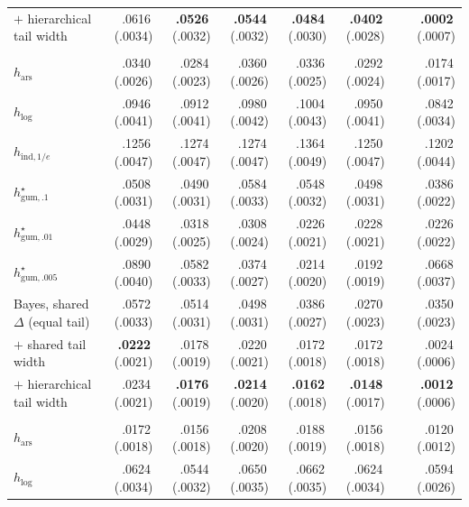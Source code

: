 \documentclass[11pt]{article}
\newcommand{\mcse}[2]{\mbox{#1\,{\fontsize{7}{8}\selectfont(#2)}}}
\newcommand{\bestmcse}[2]{\mbox{\textbf{#1}\,{\fontsize{7}{8}\selectfont(#2)}}}
\begin{document}
\begin{table}[htbp]
\begin{tabular}{@{}lrrrrrcr@{}}
\quad $+$ hierarchical tail width & \mcse{.0616}{.0034} & \bestmcse{.0526}{.0032} & \bestmcse{.0544}{.0032} & \bestmcse{.0484}{.0030} & \bestmcse{.0402}{.0028} & & \bestmcse{.0002}{.0007} \\
\addlinespace[4pt]
\multicolumn{8}{@{}l}{\textit{Horizon $n=300$}}\\[1pt]
$h_{\mathrm{ars}}$ & \mcse{.0340}{.0026} & \mcse{.0284}{.0023} & \mcse{.0360}{.0026} & \mcse{.0336}{.0025} & \mcse{.0292}{.0024} & & \mcse{.0174}{.0017} \\
$h_{\log}$ & \mcse{.0946}{.0041} & \mcse{.0912}{.0041} & \mcse{.0980}{.0042} & \mcse{.1004}{.0043} & \mcse{.0950}{.0041} & & \mcse{.0842}{.0034} \\
$h_{\mathrm{ind},1/e}$ & \mcse{.1256}{.0047} & \mcse{.1274}{.0047} & \mcse{.1274}{.0047} & \mcse{.1364}{.0049} & \mcse{.1250}{.0047} & & \mcse{.1202}{.0044} \\
$h^\star_{\mathrm{gum},.1}$ & \mcse{.0508}{.0031} & \mcse{.0490}{.0031} & \mcse{.0584}{.0033} & \mcse{.0548}{.0032} & \mcse{.0498}{.0031} & & \mcse{.0386}{.0022} \\
$h^\star_{\mathrm{gum},.01}$ & \mcse{.0448}{.0029} & \mcse{.0318}{.0025} & \mcse{.0308}{.0024} & \mcse{.0226}{.0021} & \mcse{.0228}{.0021} & & \mcse{.0226}{.0022} \\
$h^\star_{\mathrm{gum},.005}$ & \mcse{.0890}{.0040} & \mcse{.0582}{.0033} & \mcse{.0374}{.0027} & \mcse{.0214}{.0020} & \mcse{.0192}{.0019} & & \mcse{.0668}{.0037} \\
Bayes, shared $\Delta$ (equal tail) & \mcse{.0572}{.0033} & \mcse{.0514}{.0031} & \mcse{.0498}{.0031} & \mcse{.0386}{.0027} & \mcse{.0270}{.0023} & & \mcse{.0350}{.0023} \\
\quad $+$ shared tail width & \bestmcse{.0222}{.0021} & \mcse{.0178}{.0019} & \mcse{.0220}{.0021} & \mcse{.0172}{.0018} & \mcse{.0172}{.0018} & & \mcse{.0024}{.0006} \\
\quad $+$ hierarchical tail width & \mcse{.0234}{.0021} & \bestmcse{.0176}{.0019} & \bestmcse{.0214}{.0020} & \bestmcse{.0162}{.0018} & \bestmcse{.0148}{.0017} & & \bestmcse{.0012}{.0006} \\
\addlinespace[4pt]
\multicolumn{8}{@{}l}{\textit{Horizon $n=700$}}\\[1pt]
$h_{\mathrm{ars}}$ & \mcse{.0172}{.0018} & \mcse{.0156}{.0018} & \mcse{.0208}{.0020} & \mcse{.0188}{.0019} & \mcse{.0156}{.0018} & & \mcse{.0120}{.0012} \\
$h_{\log}$ & \mcse{.0624}{.0034} & \mcse{.0544}{.0032} & \mcse{.0650}{.0035} & \mcse{.0662}{.0035} & \mcse{.0624}{.0034} & & \mcse{.0594}{.0026} \\

\end{tabular}
\end{table}
\end{document}
